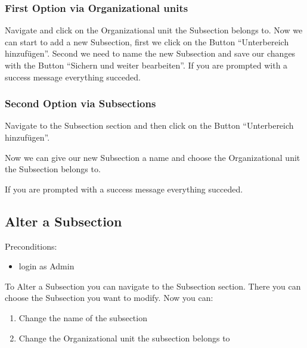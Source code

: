 \documentclass[letterpaper,10pt,english]{sphinxmanual}
\begin{document}
\subsubsection{First Option via Organizational units}
\label{\detokenize{masterUserDoc:first-option-via-organizational-units}}
Navigate and click on the Organizational unit the Subsection belongs to.
Now we can start to add a new Subsection, first we click on the Button
“Unterbereich hinzufügen”. Second we need to name the new Subsection and
save our changes with the Button “Sichern und weiter bearbeiten”.
If you are prompted with a success message everything succeded.

\noindent{}


\subsubsection{Second Option via Subsections}
\label{\detokenize{masterUserDoc:second-option-via-subsections}}
Navigate to the Subsection section and then click on the Button “Unterbereich hinzufügen”.

\noindent{}

Now we can give our new Subsection a name and choose the Organizational unit
the Subsection belongs to.

\noindent{}

If you are prompted with a success message everything succeded.


\subsection{Alter a Subsection}
\label{\detokenize{masterUserDoc:alter-a-subsection}}
Pre\sphinxhyphen{}conditions:
\begin{itemize}
\item {} 
login as Admin

\end{itemize}

To Alter a Subsection you can navigate to the Subsection section. There you can choose
the Subsection you want to modify. Now you can:
\begin{enumerate}
%
\item {} 
Change the name of the subsection

\item {} 
Change the Organizational unit the subsection belongs to

\end{enumerate}
\end{document}
